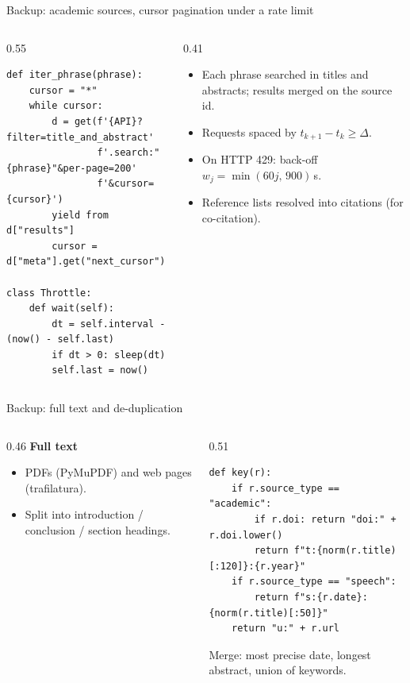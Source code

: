 \documentclass[aspectratio=169,10pt]{beamer}
\begin{document}
\begin{frame}[fragile]{Backup: academic sources, cursor pagination under a rate limit}
\begin{columns}[T]
\begin{column}{0.55\textwidth}
\begin{lstlisting}
def iter_phrase(phrase):
    cursor = "*"
    while cursor:
        d = get(f'{API}?filter=title_and_abstract'
                f'.search:"{phrase}"&per-page=200'
                f'&cursor={cursor}')
        yield from d["results"]
        cursor = d["meta"].get("next_cursor")

class Throttle:
    def wait(self):
        dt = self.interval - (now() - self.last)
        if dt > 0: sleep(dt)
        self.last = now()
\end{lstlisting}
\end{column}
\begin{column}{0.41\textwidth}\small
\begin{itemize}
\item Each phrase searched in titles and abstracts; results merged on the source id.
\item Requests spaced by $t_{k+1}-t_k \geq \Delta$.
\item On HTTP 429: back-off $w_j = \min(60j,\,900)$\,s.
\item Reference lists resolved into citations (for co-citation).
\end{itemize}
\end{column}
\end{columns}
\end{frame}

\begin{frame}[fragile]{Backup: full text and de-duplication}
\begin{columns}[T]
\begin{column}{0.46\textwidth}\small
\textbf{Full text}
\begin{itemize}
\item PDFs (PyMuPDF) and web pages (trafilatura).
\item Split into introduction / conclusion / section headings.
\end{itemize}
\end{column}
\begin{column}{0.51\textwidth}
\begin{lstlisting}
def key(r):
    if r.source_type == "academic":
        if r.doi: return "doi:" + r.doi.lower()
        return f"t:{norm(r.title)[:120]}:{r.year}"
    if r.source_type == "speech":
        return f"s:{r.date}:{norm(r.title)[:50]}"
    return "u:" + r.url
\end{lstlisting}
\small Merge: most precise date, longest abstract, union of keywords.
\end{column}
\end{columns}
\end{frame}
\end{document}
